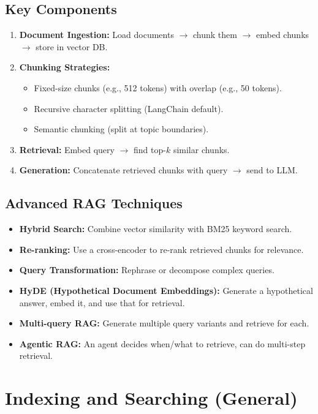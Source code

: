 \documentclass[11pt,a4paper]{article}
\begin{document}
\subsection{Key Components}
\begin{enumerate}[nosep]
  \item \textbf{Document Ingestion:} Load documents $\rightarrow$ chunk them $\rightarrow$ embed chunks $\rightarrow$ store in vector DB.
  \item \textbf{Chunking Strategies:}
    \begin{itemize}[nosep]
      \item Fixed-size chunks (e.g., 512 tokens) with overlap (e.g., 50 tokens).
      \item Recursive character splitting (LangChain default).
      \item Semantic chunking (split at topic boundaries).
    \end{itemize}
  \item \textbf{Retrieval:} Embed query $\rightarrow$ find top-$k$ similar chunks.
  \item \textbf{Generation:} Concatenate retrieved chunks with query $\rightarrow$ send to LLM.
\end{enumerate}

\subsection{Advanced RAG Techniques}
\begin{itemize}[nosep]
  \item \textbf{Hybrid Search:} Combine vector similarity with BM25 keyword search.
  \item \textbf{Re-ranking:} Use a cross-encoder to re-rank retrieved chunks for relevance.
  \item \textbf{Query Transformation:} Rephrase or decompose complex queries.
  \item \textbf{HyDE (Hypothetical Document Embeddings):} Generate a hypothetical answer, embed it, and use that for retrieval.
  \item \textbf{Multi-query RAG:} Generate multiple query variants and retrieve for each.
  \item \textbf{Agentic RAG:} An agent decides when/what to retrieve, can do multi-step retrieval.
\end{itemize}

\section{Indexing and Searching (General)}
\end{document}
